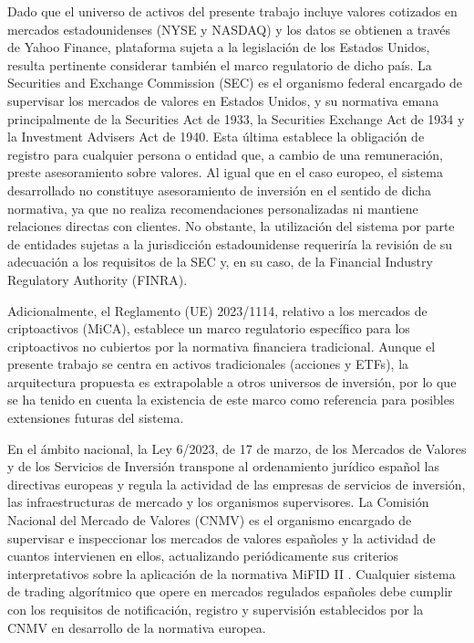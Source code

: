 \documentclass[
]{article}
\begin{document}
Dado que el universo de activos del presente trabajo incluye valores cotizados en mercados estadounidenses (NYSE y NASDAQ) y los datos se obtienen a través de Yahoo Finance, plataforma sujeta a la legislación de los Estados Unidos, resulta pertinente considerar también el marco regulatorio de dicho país. La Securities and Exchange Commission (SEC) es el organismo federal encargado de supervisar los mercados de valores en Estados Unidos, y su normativa emana principalmente de la Securities Act de 1933, la Securities Exchange Act de 1934 \parencite{SEC1934} y la Investment Advisers Act de 1940. Esta última establece la obligación de registro para cualquier persona o entidad que, a cambio de una remuneración, preste asesoramiento sobre valores. Al igual que en el caso europeo, el sistema desarrollado no constituye asesoramiento de inversión en el sentido de dicha normativa, ya que no realiza recomendaciones personalizadas ni mantiene relaciones directas con clientes. No obstante, la utilización del sistema por parte de entidades sujetas a la jurisdicción estadounidense requeriría la revisión de su adecuación a los requisitos de la SEC y, en su caso, de la Financial Industry Regulatory Authority (FINRA).

Adicionalmente, el Reglamento (UE) 2023/1114, relativo a los mercados de criptoactivos (MiCA), establece un marco regulatorio específico para los criptoactivos no cubiertos por la normativa financiera tradicional. Aunque el presente trabajo se centra en activos tradicionales (acciones y ETFs), la arquitectura propuesta es extrapolable a otros universos de inversión, por lo que se ha tenido en cuenta la existencia de este marco como referencia para posibles extensiones futuras del sistema.

En el ámbito nacional, la Ley 6/2023, de 17 de marzo, de los Mercados de Valores y de los Servicios de Inversión \parencite{Ley2023} transpone al ordenamiento jurídico español las directivas europeas y regula la actividad de las empresas de servicios de inversión, las infraestructuras de mercado y los organismos supervisores. La Comisión Nacional del Mercado de Valores (CNMV) es el organismo encargado de supervisar e inspeccionar los mercados de valores españoles y la actividad de cuantos intervienen en ellos, actualizando periódicamente sus criterios interpretativos sobre la aplicación de la normativa MiFID II \parencite{CNMV2026}. Cualquier sistema de trading algorítmico que opere en mercados regulados españoles debe cumplir con los requisitos de notificación, registro y supervisión establecidos por la CNMV en desarrollo de la normativa europea.
\end{document}
